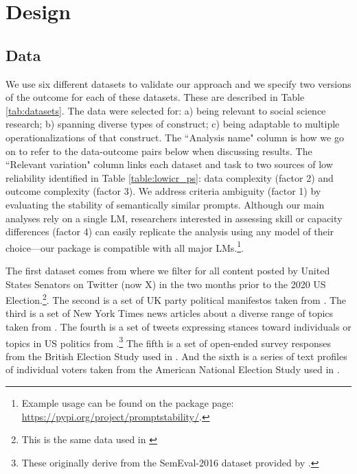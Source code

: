 \documentclass{article}
\begin{document}
\section{Design}
\subsection{Data}

We use six different datasets to validate our approach and we specify two versions of the outcome for each of these datasets. These are described in Table \ref{tab:datasets}. The data were selected for: a) being relevant to social science research;  b) spanning diverse types of construct; c) being adaptable to multiple operationalizations of that construct. The ``Analysis name" column is how we go on to refer to the data-outcome pairs below when discussing results. The ``Relevant variation" column links each dataset and task to two sources of low reliability identified in Table \ref{table:lowicr_ps}: data complexity (factor 2) and outcome complexity (factor 3). We address criteria ambiguity (factor 1) by evaluating the stability of semantically similar prompts. Although our main analyses rely on a single LM, researchers interested in assessing skill or capacity differences (factor 4) can easily replicate the analysis using any model of their choice—our package is compatible with all major LMs.\footnote{Example usage can be found on the package page: \url{https://pypi.org/project/promptstability/}.}.

The first dataset comes from \cite{van2020twitter} where we filter for all content posted by United States Senators on Twitter (now X) in the two months prior to the 2020 US Election.\footnote{This is the same data used in \cite{tornberg2023chatgpt}}. The second is a set of UK party political manifestos taken from \cite{benoit2016crowd}. The third is a set of New York Times news articles about a diverse range of topics taken from \cite{young2012affective}. The fourth is a set of tweets expressing stances toward individuals or topics in US politics from \cite{ziems2024can}.\footnote{These originally derive from the SemEval-2016 dataset provided by \cite{mohammad2016semeval}.} The fifth is a set of open-ended survey responses from the British Election Study used in \cite{mellon2024ais}. And the sixth is a series of text profiles of individual voters taken from the American National Election Study used in \cite{argyle2023out}.
\end{document}
